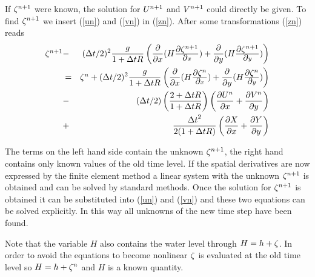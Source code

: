 If $\zn$ were known, the solution for
$\un$ and $\vn$ could directly be given. To find $\zn$ we insert
(\ref{un}) and (\ref{vn}) in (\ref{zn}). After some transformations
(\ref{zn}) reads
\begin{eqnarray} \label{zsys}
        \zn
    & - &
        (\dt/2)^{2} \frac{g}{1+\dt R}         \nonumber
	\paren{ \frac{\dpp}{\dpp x}(H \dzxn) + \frac{\dpp}{\dpp y}(H \dzyn) } \\
    & = &
        \zo + (\dt/2)^{2} \frac{g}{1+\dt R}
	\paren{ \frac{\dpp}{\dpp x}(H \dzxo) + \frac{\dpp}{\dpp y}(H \dzyo) } \\
    & - & (\dt/2) \paren{ \frac{2+\dt R}{1+\dt R} }
        \paren{                               \nonumber
          \frac{\dpp \uo}{\dpp x}
        + \frac{\dpp \vo}{\dpp y}
        } \\
    & + & \frac{\dt^{2}}{2(1+\dt R)}            \nonumber
                \paren{ \frac{\dpp X}{\dpp x} + \frac{\dpp Y}{\dpp y} }
\end{eqnarray}

The terms on the left hand side contain the unknown $\zn$, the right hand
contains only known values of the old time level. If the spatial derivatives
are now expressed by the finite element method a linear system with the unknown
$\zn$ is obtained and can be solved by standard methods. Once the solution
for $\zn$ is obtained it can be substituted into (\ref{un}) and (\ref{vn})
and these two equations can be solved explicitly. In this way all unknowns
of the new time step have been found.

Note that the variable $H$ also contains the water level through
$H=h+\zz$. In order to avoid the equations to become nonlinear $\zz$
is evaluated at the old time level so $H=h+\zo$ and $H$ is a known quantity.









